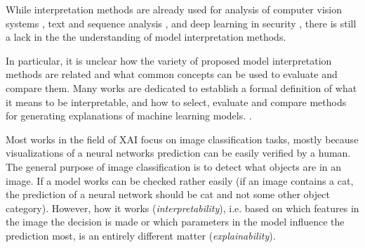 




While interpretation methods are already used for analysis of computer vision systems \cite{bach2015pixel, simonyan2013deep, zeiler2014visualizing}, text and sequence analysis \cite{ancona2017towards, arras2017relevant}, and deep learning in security \cite{evaluating_explanations_security}, there is still a lack in the the understanding of model interpretation methods. 

In particular, it is unclear how the variety of proposed model interpretation methods are related and what common concepts can be used to evaluate and compare them. 
Many works are dedicated to establish a formal definition of what it means to be interpretable, and how to select, evaluate and compare methods for generating explanations of machine learning models. \cite{murdoch2019definitions, lipton2018mythos}.





Most works in the field of XAI focus on image classification tasks, mostly because visualizations of a neural networks prediction can be easily verified by a human. The general purpose of image classification is to detect what objects are in an image. If a model works can be checked rather easily (if an image contains a cat, the prediction of a neural network should be cat and not some other object category). However, how it works (\textit{interpretability}), i.e. based on which features in the image the decision is made or which parameters in the model influence the prediction most, is an entirely different matter (\textit{explainability}).  

